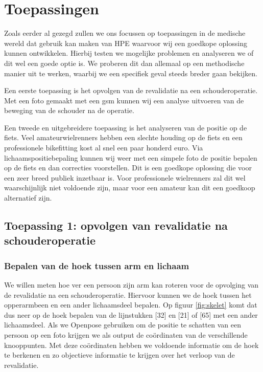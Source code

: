 \documentclass[a4paper,twoside,kulak]{kulakreport}
\begin{document}
\chapter{Toepassingen}
Zoals eerder al gezegd zullen we ons focussen op toepassingen in de medische wereld dat gebruik kan maken van HPE waarvoor wij een goedkope oplossing kunnen ontwikkelen. Hierbij testen we mogelijke problemen en analyseren we of dit wel een goede optie is. We proberen dit dan allemaal op een methodische manier uit te werken, waarbij we een specifiek geval steeds breder gaan bekijken.


Een eerste toepassing is het opvolgen van de revalidatie na een schouderoperatie. Met een foto gemaakt met een gsm kunnen wij een analyse uitvoeren van de beweging van de schouder na de operatie.

Een tweede en uitgebreidere toepassing is het analyseren van de positie op de fiets. Veel amateurwielrenners hebben een slechte houding op de fiets en een professionele bikefitting kost al snel een paar honderd euro. Via lichaamspositiebepaling kunnen wij weer met een simpele foto de positie bepalen op de fiets en dan correcties voorstellen. Dit is een goedkope oplossing die voor een zeer breed publiek inzetbaar is. Voor professionele wielrenners zal dit wel waarschijnlijk niet voldoende zijn, maar voor een amateur kan dit een goedkoop alternatief zijn.



\section{Toepassing 1: opvolgen van revalidatie na schouderoperatie}
\subsection{Bepalen van de hoek tussen arm en lichaam}

We willen meten hoe ver een persoon zijn arm kan roteren voor de opvolging van de revalidatie na een schouderoperatie. Hiervoor kunnen we de hoek tussen het opperarmbeen en een ander lichaamsdeel bepalen. Op figuur \ref{fig:skelet} komt dat dus neer op de hoek bepalen van de lijnstukken [32] en [21] of [65] met een ander lichaamsdeel. Als we Openpose gebruiken om de positie te schatten van een persoon op een foto krijgen we als output de coördinaten van de verschillende knooppunten. Met deze coördinaten hebben we voldoende informatie om de hoek te berkenen en zo objectieve informatie te krijgen over het verloop van de revalidatie.
\end{document}
